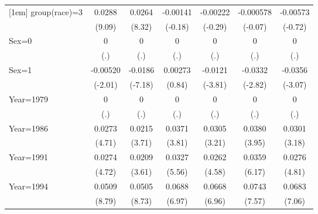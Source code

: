 \begin{table}[htbp]
\begin{tabular}{l*{6}{c}}
[1em]
group(race)=3       &      0.0288\sym{***}&      0.0264\sym{***}&    -0.00141         &    -0.00222         &   -0.000578         &    -0.00573         \\
                    &      (9.09)         &      (8.32)         &     (-0.18)         &     (-0.29)         &     (-0.07)         &     (-0.72)         \\
[1em]
Sex=0               &           0         &           0         &           0         &           0         &           0         &           0         \\
                    &         (.)         &         (.)         &         (.)         &         (.)         &         (.)         &         (.)         \\
[1em]
Sex=1               &    -0.00520\sym{*}  &     -0.0186\sym{***}&     0.00273         &     -0.0121\sym{***}&     -0.0332\sym{**} &     -0.0356\sym{**} \\
                    &     (-2.01)         &     (-7.18)         &      (0.84)         &     (-3.81)         &     (-2.82)         &     (-3.07)         \\
[1em]
Year=1979           &           0         &           0         &           0         &           0         &           0         &           0         \\
                    &         (.)         &         (.)         &         (.)         &         (.)         &         (.)         &         (.)         \\
[1em]
Year=1986           &      0.0273\sym{***}&      0.0215\sym{***}&      0.0371\sym{***}&      0.0305\sym{**} &      0.0380\sym{***}&      0.0301\sym{**} \\
                    &      (4.71)         &      (3.71)         &      (3.81)         &      (3.21)         &      (3.95)         &      (3.18)         \\
[1em]
Year=1991           &      0.0274\sym{***}&      0.0209\sym{***}&      0.0327\sym{***}&      0.0262\sym{***}&      0.0359\sym{***}&      0.0276\sym{***}\\
                    &      (4.72)         &      (3.61)         &      (5.56)         &      (4.58)         &      (6.17)         &      (4.81)         \\
[1em]
Year=1994           &      0.0509\sym{***}&      0.0505\sym{***}&      0.0688\sym{***}&      0.0668\sym{***}&      0.0743\sym{***}&      0.0683\sym{***}\\
                    &      (8.79)         &      (8.73)         &      (6.97)         &      (6.96)         &      (7.57)         &      (7.06)         \\

\end{tabular}
\end{table}

